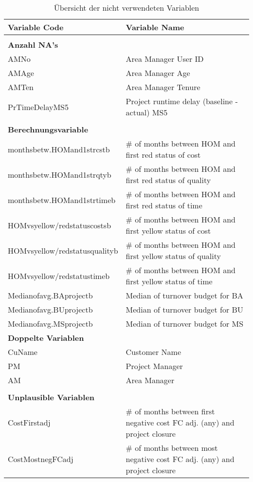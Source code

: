 \begin{longtable}[ht]{p{} p{}}
	\caption{Übersicht der nicht verwendeten Variablen}\\
		\textbf{Variable Code} & \textbf{Variable Name} \\\hline\endhead
		 & \\
		\textbf{Anzahl NA's} &  \\\hline
		AMNo  & Area Manager User ID \\
		AMAge & Area Manager Age \\
		AMTen & Area Manager Tenure \\
		PrTimeDelayMS5 & Project runtime delay (baseline - actual) MS5 \\
		&\\
		\textbf{Berechnungsvariable} &  \\\hline
		monthsbetw.HOMand1strcstb & \# of months between HOM and first red status of cost \\
		monthsbetw.HOMand1strqtyb & \# of months between HOM and first red status of quality \\
		monthsbetw.HOMand1strtimeb & \# of months between HOM and first red status of time \\
		HOMvsyellow/redstatuscostsb & \# of months between HOM and first yellow status of cost \\
		HOMvsyellow/redstatusqualityb & \# of months between HOM and first yellow status of quality \\
		HOMvsyellow/redstatustimeb & \# of months between HOM and first yellow status of time \\
		Medianofavg.BAprojectb & Median of turnover budget for BA \\
		Medianofavg.BUprojectb & Median of turnover budget for BU \\
		Medianofavg.MSprojectb & Median of turnover budget for MS \\
		\textbf{Doppelte Variablen} &  \\\hline
		CuName & Customer Name \\
		PM    & Project Manager \\
		AM    & Area Manager \\
		&\\
		\textbf{Unplausible Variablen} &  \\\hline
		CostFirstadj & \# of months between first negative cost FC adj. (any) and project closure \\
		CostMostnegFCadj & \# of months between most negative cost FC adj. (any) and project closure \\

\end{longtable}
